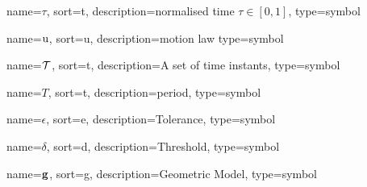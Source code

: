 	{%
		name={\ensuremath{\tau}},
		sort=t,
		description=normalised time \ensuremath{\tau \in [0, 1]},
		type=symbol
	}
	\newcommand{\timenorm}{\gls{sym:timenorm}}

	{%
		name={\ensuremath{\func{u}}},
		sort=u,
		description=motion law
		type=symbol
	}
	\newcommand{\motionlaw}{\gls{sym:motionlaw}}

	{%
		name={\ensuremath{\set{T}}},
		sort=t,
		description=A set of time instants,
		type=symbol
	}
	\newcommand{\setoftimeinstants}{\gls{sym:setoftimeinstants}}

	{%
		name={\ensuremath{T}},
		sort=t,
		description=period,
		type=symbol
	}
	\newcommand{\period}{\gls{sym:period}}

	{%
		name={\ensuremath{\epsilon}},
		sort=e,
		description=Tolerance,
		type=symbol
	}
	\newcommand{\tol}{\gls{sym:tolerance}}

	{%
		name={\ensuremath{\delta}},
		sort=d,
		description=Threshold,
		type=symbol
	}
	\newcommand{\threshold}{\gls{sym:threshold}}

	{%
		name={\ensuremath{\vecfunc{g}}},
		sort=g,
		description=Geometric Model,
		type=symbol
	}
	\newcommand{\geometricmodel}{\gls{sym:geometricmodel}}

